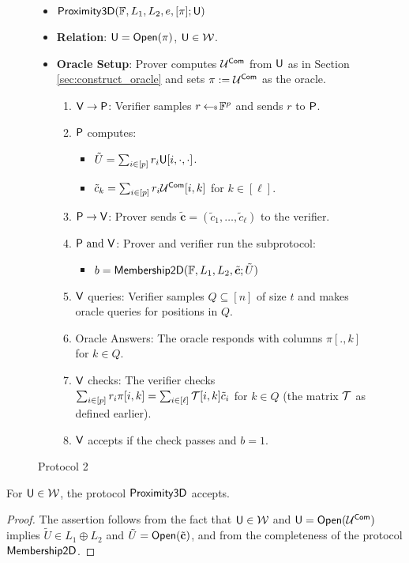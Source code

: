 \begin{figure}[h!]
\begin{framed}
\begin{itemize}
\item {$\mathsf{Proximity3D}(\mathbb{F},L_1,L_2,e,[\pi];\mathsf{U})$}
\item {\bf Relation}: $\mathsf{U}=\mathsf{Open}(\pi)$, $\mathsf{U}\in \mathcal{W}$.
\item {\bf Oracle Setup}: Prover computes $\mathcal{U}^{\mathsf{Com}}$ from $\mathsf{U}$ as in
Section \ref{sec:construct_oracle} and sets
$\pi := \mathcal{U}^{\mathsf{Com}}$ as the oracle.
\begin{enumerate}[{1.}]
\item $\mathsf{V}\rightarrow \mathsf{P}$: Verifier samples $r\hskip2.3pt{\gets\!\!\mbox{\tiny${\$}$\normalsize}}\, \mathbb{F}^p$ and
sends $r$ to $\mathsf{P}$.
\item $\mathsf{P}$ computes: 
	\begin{itemize}
	\item $\tilde{U}=\sum_{i\in [p]}r_i\mathsf{U}[i,\cdot,\cdot]$.
	\item $\tilde{c}_k = \sum_{i\in [p]}r_i\mathcal{U}^{\mathsf{Com}}[i,k]$ for $k\in [\ell]$.
	\end{itemize}
\item $\mathsf{P}\rightarrow \mathsf{V}$: Prover sends
$\tilde{\bm{c}}=(\tilde{c}_1,\ldots,\tilde{c}_\ell)$ to the verifier.
\item $\mathsf{P} \text{ and } \mathsf{V}$: Prover and verifier run the subprotocol:
	\begin{itemize}
	\item $b=\mathsf{Membership2D}(\mathbb{F},L_1,L_2,\tilde{\bm{c}};\tilde{U})$
	\end{itemize}
\item $\mathsf{V}$ queries: Verifier samples $Q\subseteq [n]$ of size
$t$ and makes oracle queries for positions in $Q$.
\item Oracle Answers: The oracle responds with columns $\pi[.,k]$ for
$k\in Q$.
\item $\mathsf{V}$ checks: The verifier checks $\sum_{i\in
[p]}r_i\pi[i,k]=\sum_{i\in [\ell]}\mathcal{T}[i,k]\tilde{c}_i$ for $k\in Q$ (the matrix $\mathcal{T}$ as defined earlier).
\item $\mathsf{V}$ accepts if the check passes and $b=1$.
\end{enumerate}
\end{itemize}
\end{framed}
\caption{Protocol 2}
\end{figure}

\begin{lemma}[Completeness]\label{lem:proximity3d_complete}
For $\mathsf{U}\in\mathcal{W}$, the protocol $\mathsf{Proximity3D}$ accepts.
\end{lemma}
\begin{proof}
The assertion follows from the fact that $\mathsf{U}\in \mathcal{W}$ and
$\mathsf{U}=\mathsf{Open}(\mathcal{U}^{\mathsf{Com}})$ implies $\tilde{U}\in L_1\oplus L_2$ and
$\tilde{U}=\mathsf{Open}(\tilde{\mathbf{c}})$, and from the completeness of the protocol
$\mathsf{Membership2D}$.
\end{proof}

